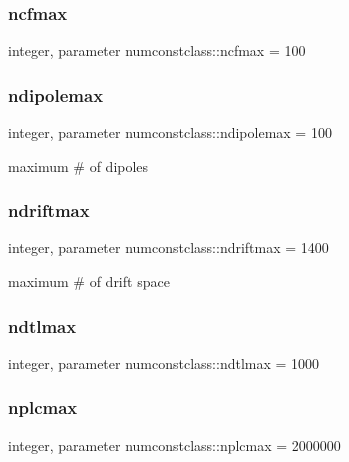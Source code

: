 \subsubsection{\texorpdfstring{ncfmax}{ncfmax}}
{\footnotesize\ttfamily integer, parameter numconstclass\+::ncfmax = 100}

\mbox{\label{namespacenumconstclass_a35f5d91828a6dc16c619583554a1566d}} 
\subsubsection{\texorpdfstring{ndipolemax}{ndipolemax}}
{\footnotesize\ttfamily integer, parameter numconstclass\+::ndipolemax = 100}



maximum \# of dipoles 

\mbox{\label{namespacenumconstclass_a22030f070a90c877bef951b411dac428}} 
\subsubsection{\texorpdfstring{ndriftmax}{ndriftmax}}
{\footnotesize\ttfamily integer, parameter numconstclass\+::ndriftmax = 1400}



maximum \# of drift space 

\mbox{\label{namespacenumconstclass_a36b8673b359ee1e52cd37349ec8e51ad}} 
\subsubsection{\texorpdfstring{ndtlmax}{ndtlmax}}
{\footnotesize\ttfamily integer, parameter numconstclass\+::ndtlmax = 1000}

\mbox{\label{namespacenumconstclass_a6bb8beba48502784bfcd08114a616b9b}} 
\subsubsection{\texorpdfstring{nplcmax}{nplcmax}}
{\footnotesize\ttfamily integer, parameter numconstclass\+::nplcmax = 2000000}



